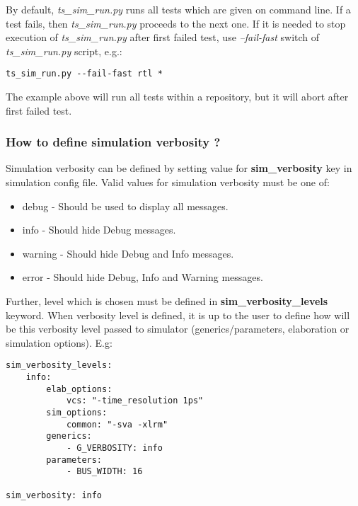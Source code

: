 \documentclass{tropic_design_spec}
\begin{document}
By default, \textit{ts_sim_run.py} runs all tests which are given on command line. If a
test fails, then \textit{ts_sim_run.py} proceeds to the next one. If it is needed to stop
execution of \textit{ts_sim_run.py} after first failed test, use \textit{--fail-fast}
switch of \textit{ts_sim_run.py} script, e.g.:

\begin{lstlisting}
ts_sim_run.py --fail-fast rtl *
\end{lstlisting}

The example above will run all tests within a repository, but it will abort after first
failed test.


\subsubsection{How to define simulation verbosity ?}
\label{sec:how-to-define-simulation-verbosity}

Simulation verbosity can be defined by setting value for \textbf{sim_verbosity} key in
simulation config file. Valid values for simulation verbosity must be one of:

\begin{itemize}
    \item{debug - Should be used to display all messages.}
    \item{info - Should hide Debug messages.}
    \item{warning - Should hide Debug and Info messages.}
    \item{error - Should hide Debug, Info and Warning messages.}
\end{itemize}

Further, level which is chosen must be defined in \textbf{sim_verbosity_levels} keyword.
When verbosity level is defined, it is up to the user to define how will be this verbosity
level passed to simulator (generics/parameters, elaboration or simulation options). E.g:

\begin{lstlisting}
sim_verbosity_levels:
    info:
        elab_options:
            vcs: "-time_resolution 1ps"
        sim_options:
            common: "-sva -xlrm"
        generics:
            - G_VERBOSITY: info
        parameters:
            - BUS_WIDTH: 16

sim_verbosity: info
\end{lstlisting}
\end{document}
